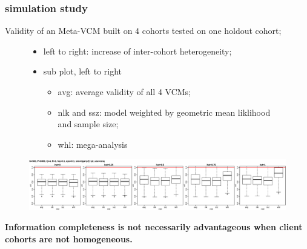 \documentclass{beamer}
\begin{document}
\begin{frame}\frametitle{simulation study}
  Validity of an Meta-VCM built on $4$ cohorts tested on one holdout cohort;
  \begin{figure}
    \raggedright \scriptsize
    \begin{itemize}
    \item left to right: increase of inter-cohort heterogeneity;\\
    \item sub plot, left to right
      \begin{itemize} \scriptsize
      \item avg: average validity of all 4 VCMs;
      \item nlk and ssz: model weighted by geometric mean liklihood
        and sample size;
      \item whl: mega-analysis
      \end{itemize}
    \end{itemize}
    \centering
    \includegraphics[width=\linewidth]{km2_mnq_s01.png}
  \end{figure}
  \normalsize
  \textbf{Information completeness is not necessarily advantageous
    when client cohorts are not homogeneous.}
\end{frame}
\end{document}
